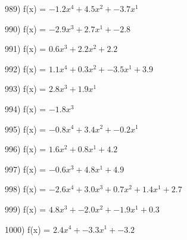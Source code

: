 \documentclass[10pt,a4paper]{article}
\begin{document}
989) f(x) = $-1.2x^4 + 4.5x^2 + -3.7x^1$

990) f(x) = $-2.9x^3 + 2.7x^1 + -2.8$

991) f(x) = $0.6x^3 + 2.2x^2 + 2.2$

992) f(x) = $1.1x^4 + 0.3x^2 + -3.5x^1 + 3.9$

993) f(x) = $2.8x^3 + 1.9x^1$

994) f(x) = $-1.8x^3$

995) f(x) = $-0.8x^4 + 3.4x^2 + -0.2x^1$

996) f(x) = $1.6x^2 + 0.8x^1 + 4.2$

997) f(x) = $-0.6x^3 + 4.8x^1 + 4.9$

998) f(x) = $-2.6x^4 + 3.0x^3 + 0.7x^2 + 1.4x^1 + 2.7$

999) f(x) = $4.8x^3 + -2.0x^2 + -1.9x^1 + 0.3$

1000) f(x) = $2.4x^4 + -3.3x^1 + -3.2$
\end{document}
